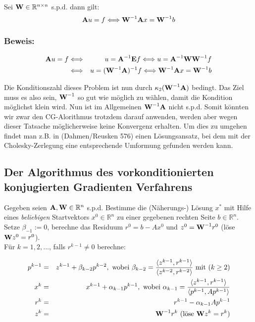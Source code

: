 Sei ${\textbf{W}} \in \mathbb{R}^{n \times n}$ s.p.d. dann gilt:
\begin{equation}
{\textbf{A}}u = f \Longleftrightarrow {\textbf{W}}^{-1} {\textbf{A}} x = {\textbf{W}}^{-1} b
\end{equation}

\subsubsection{Beweis:}

\begin{eqnarray}
{\textbf{A}}u = f &\Longleftrightarrow& u = {\textbf{A}}^{-1} {\textbf{E}} f \Longleftrightarrow u = {\textbf{A}}^{-1} {\textbf{W}} {\textbf{W}}^{-1} f \notag \\
&\Longleftrightarrow& u = ({\textbf{W}}^{-1} {\textbf{A}})^{-1} f \Longleftrightarrow {\textbf{W}}^{-1} {\textbf{A}} x = {\textbf{W}}^{-1} b \notag
\end{eqnarray}

Die Konditionszahl dieses Problem ist nun durch $\kappa_{2}({\textbf{W}}^{-1}{\textbf{A}})$ bedingt. Das Ziel muss es also sein, ${\textbf{W}}^{-1}$ so gut wie möglich zu wählen, damit die Kondition möglichst klein wird. Nun ist im Allgemeinen ${\textbf{W}}^{-1}{\textbf{A}}$ nicht s.p.d. Somit könnten wir zwar den CG-Alorithmus trotzdem darauf anwenden, werden aber wegen dieser Tatsache möglicherweise keine Konvergenz erhalten. Um dies zu umgehen findet man z.B. in (Dahmen/Reusken 576) einen Lösungsansatz, bei dem mit der Cholesky-Zerlegung eine entsprechende Umformung gefunden werden kann.

\subsection{Der Algorithmus des vorkonditionierten konjugierten Gradienten Verfahrens}\label{ss.Algorithmus PCG}

Gegeben seien ${\textbf{A}}, {\textbf{W}} \in \mathbb{R}^{n}$ s.p.d. Bestimme die (Näherungs-) Lösung $x^{*}$ mit Hilfe eines \textit{beliebigen} Startvektors $x^{0} \in \mathbb{R}^{n}$ zu einer gegebenen rechten Seite $b \in \mathbb{R}^{n}$. Setze $\beta_{-1} := 0$, berechne das Residuum $r^{0} = b - Ax^{0}$ und $z^{0} = {\textbf{W}}^{-1}r^{0}$ (löse ${\textbf{W}}z^{0} = r^{0}$).\\
Für $k = 1,2,...$, falls $r^{k-1} \ne 0$ berechne:

\begin{eqnarray}
p^{k-1} &=& z^{k-1} + \beta_{k-2}p^{k-2}, \textnormal{ wobei } \beta_{k-2} = \frac {\langle z^{k-1}, r^{k-1} \rangle} {\langle z^{k-2}, r^{k-2} \rangle} \textnormal{ mit } (k \ge 2) \notag \\
x^{k} &=& x^{k-1} + \alpha_{k-1}p^{k-1}, \textnormal{ wobei } \alpha_{k-1} = \frac {\langle z^{k-1}, r^{k-1} \rangle} {\langle p^{k-1}, Ap^{k-1} \rangle} \notag \\
r^{k} &=& r^{k-1} - \alpha_{k-1}Ap^{k-1} \notag \\
z^{k} &=& {\textbf{W}}^{-1}r^{k} \textnormal{ (löse } {\textbf{W}}z^{k} = r^{k}) \notag
\end{eqnarray}

